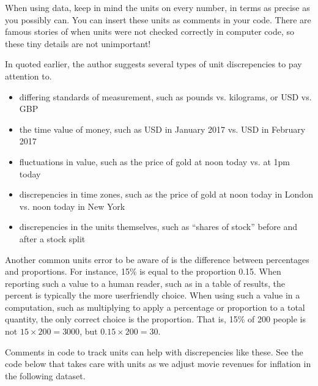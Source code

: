 \documentclass[letterpaper,10pt,english]{sphinxmanual}
\begin{document}
When using data, keep in mind the units on every number, in terms as precise as you possibly can.  You can insert these units as comments in your code.  There are famous stories of  when units were not checked correctly in computer code, so these tiny details are not unimportant!

In  quoted earlier, the author suggests several types of unit discrepencies to pay attention to.
\begin{itemize}
\item {} 
differing standards of measurement, such as pounds vs. kilograms, or USD vs. GBP

\item {} 
the time value of money, such as USD in January 2017 vs. USD in February 2017

\item {} 
fluctuations in value, such as the price of gold at noon today vs. at 1pm today

\item {} 
discrepencies in time zones, such as the price of gold at noon today in London vs. noon today in New York

\item {} 
discrepencies in the units themselves, such as “shares of stock” before and after a stock split

\end{itemize}

Another common units error to be aware of is the difference between percentages and proportions.  For instance, 15\% is equal to the proportion 0.15.  When reporting such a value to a human reader, such as in a table of results, the percent is typically the more user\sphinxhyphen{}friendly choice.  When using such a value in a computation, such as multiplying to apply a percentage or proportion to a total quantity, the only correct choice is the proportion.  That is, 15\% of 200 people is not \(15\times200=3000\), but \(0.15\times200=30\).

Comments in code to track units can help with discrepencies like these.  See the code below that takes care with units as we adjust movie revenues for inflation in the following dataset.
\end{document}
